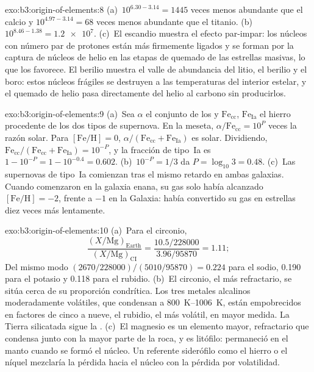 \begin{solution}{exo:b3:origin-of-elements:8}
(a)~$10^{6.30 - 3.14} = 1445$ veces menos abundante que el calcio y
$10^{4.97 - 3.14} = 68$ veces menos abundante que el titanio. (b)~$10^{8.46 - 1.38}
= \num{1.2e7}$. (c)~El escandio muestra el efecto par-impar: los núcleos con
número par de protones están más firmemente ligados y se forman por la
captura de núcleos de helio en las etapas de quemado de las estrellas masivas, lo que
los favorece. El berilio muestra el valle de abundancia del litio, el berilio y el boro:
estos núcleos frágiles se destruyen a las temperaturas del interior estelar,
y el quemado de helio pasa directamente del helio al carbono
sin producirlos.
\end{solution}

\begin{solution}{exo:b3:origin-of-elements:9}
(a)~Sea $\alpha$ el conjunto de los  y $\mathrm{Fe}_\mathrm{cc}$,
$\mathrm{Fe}_\mathrm{Ia}$ el hierro procedente de los dos tipos de supernova. En
la meseta, $\alpha/\mathrm{Fe}_\mathrm{cc} = 10^{P}$ veces la
razón solar. Para $[\mathrm{Fe/H}] = 0$, $\alpha/(\mathrm{Fe}_\mathrm{cc} +
\mathrm{Fe}_\mathrm{Ia})$ es solar. Dividiendo,
$\mathrm{Fe}_\mathrm{cc}/(\mathrm{Fe}_\mathrm{cc} + \mathrm{Fe}_\mathrm{Ia})
= 10^{-P}$, y la fracción de tipo~Ia es $1 - 10^{-P} = 1 - 10^{-0.4} =
\num{0.602}$. (b)~$10^{-P} = 1/3$ da $P = \log_{10}3 = 0.48$.
(c)~Las supernovas de tipo~Ia comienzan tras el mismo retardo en ambas galaxias.
Cuando comenzaron en la galaxia enana, su gas solo había alcanzado
$[\mathrm{Fe/H}] = -2$, frente a $-1$ en la Galaxia: había convertido su gas
en estrellas diez veces más lentamente.
\end{solution}

\begin{solution}{exo:b3:origin-of-elements:10}
(a)~Para el circonio,
\[
\frac{(X/\mathrm{Mg})_\mathrm{Earth}}{(X/\mathrm{Mg})_\mathrm{CI}} =
\frac{10.5/228000}{3.96/95870} = 1.11 ;
\]
Del mismo modo $(2670/228000)/(5010/95870) = 0.224$ para el sodio,
\num{0.190} para el potasio y \num{0.118} para el rubidio. (b)~El circonio, el más refractario, se sitúa
cerca de su proporción condrítica. Los tres metales alcalinos moderadamente volátiles,
que condensan a \qtyrange{800}{1006}{K}, están empobrecidos en factores de
cinco a nueve, el rubidio, el más volátil, en mayor medida. La
Tierra silicatada sigue la . (c)~El magnesio es un elemento mayor,
refractario que condensa junto con la mayor parte de la roca, y es
litófilo: permaneció en el manto cuando se formó el núcleo. Un referente siderófilo
como el hierro o el níquel mezclaría la pérdida hacia el núcleo con la
pérdida por volatilidad.
\end{solution}

